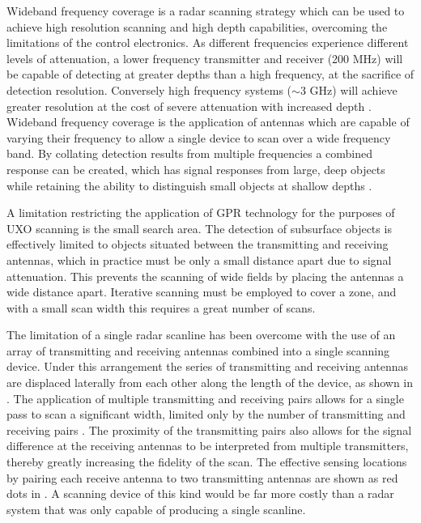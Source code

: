 \documentclass[main.tex]{subfiles}
\begin{document}
Wideband frequency coverage is a radar scanning strategy which can be used to achieve high resolution scanning and high depth capabilities, overcoming the limitations of the control electronics. As different frequencies experience different levels of attenuation, a lower frequency transmitter and receiver (200 MHz) will be capable of detecting at greater depths than a high frequency, at the sacrifice of detection resolution. Conversely high frequency systems ($\sim$3 GHz) will achieve greater resolution at the cost of severe attenuation with increased depth \parencite{shresta2003}. Wideband frequency coverage is the application of antennas which are capable of varying their frequency to allow a single device to scan over a wide frequency band. By collating detection results from multiple frequencies a combined response can be created, which has signal responses from large, deep objects while retaining the ability to distinguish small objects at shallow depths \parencite{3dradarDXG}.

A limitation restricting the application of GPR technology for the purposes of UXO scanning is the small search area. The detection of subsurface objects is effectively limited to objects situated between the transmitting and receiving antennas, which in practice must be only a small distance apart due to signal attenuation. This prevents the scanning of wide fields by placing the antennas a wide distance apart. Iterative scanning must be employed to cover a zone, and with a small scan width this requires a great number of scans.

The limitation of a single radar scanline has been overcome with the use of an array of transmitting and receiving antennas combined into a single scanning device. Under this arrangement the series of transmitting and receiving antennas are displaced laterally from each other along the length of the device, as shown in . The application of multiple transmitting and receiving pairs allows for a single pass to scan a significant width, limited only by the number of transmitting and receiving pairs \parencite{3dradarDX}. The proximity of the transmitting pairs also allows for the signal difference at the receiving antennas to be interpreted from multiple transmitters, thereby greatly increasing the fidelity of the scan. The effective sensing locations by pairing each receive antenna to two transmitting antennas are shown as red dots in . A scanning device of this kind would be far more costly than a radar system that was only capable of producing a single scanline.
\end{document}
